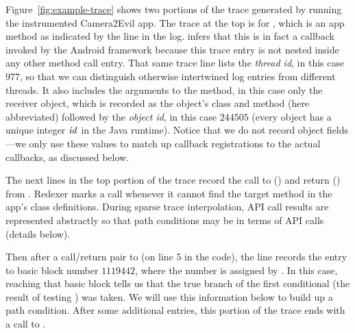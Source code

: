 Figure~\ref{fig:example-trace} shows two portions of the trace
generated by running the instrumented \textsf{Camera2Evil} app. The
trace at the top is for , which is an app
method as indicated by the  line in the
log. \hogarth{} infers that this is in fact a callback invoked by
the Android framework because this trace entry is not nested inside
any other method call entry. That same trace line lists the \emph{thread id},
in this case $977$, so that we can distinguish otherwise intertwined
log entries from different threads. It also includes the arguments to
the  method, in this case only the receiver object, which is recorded
as the object's class and method (here abbreviated) followed by the
\emph{object id}, in this case $244505$ (every object has a unique
integer $\mathit{id}$ in the Java runtime). Notice that we do not record
object fields---we only use these values to match up callback
registrations to the actual callbacks, as discussed below.



The next lines in the top portion of the trace record the call to
() and return () from
.  Redexer marks a call  whenever it 
cannot find the target method in the app's class definitions. During
sparse trace interpolation, API call results are represented
abstractly so that path conditions may be in terms of API calls
(details below).

Then after a call/return pair to  (on line 5 in the code), the line
 records the entry to basic block number
$1119442$, where the number is assigned by \hogarth{}. In this case,
reaching that basic block tells us that the true branch of the first
conditional (the result of testing ) was taken. We will
use this information below to build up a path condition. After
some additional entries, this portion of the trace ends with a call to . 

